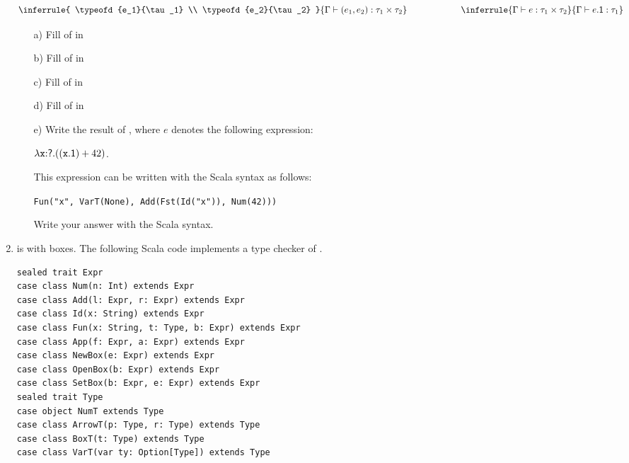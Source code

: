 \begin{enumerate}
\[
\inferrule
{ \typeofd{e_1}{\tau_1} \\ \typeofd{e_2}{\tau_2} }
{ \typeofd{(e_1,e_2)}{\tau_1\times\tau_2} }
\qquad\qquad\qquad
\inferrule
{ \typeofd{e}{\tau_1\times\tau_2} }
{ \typeofd{e\textsf{.1}}{\tau_1} }
\]

\begin{enumerate}
  \item[a)]
    Fill  of  in 
  \item[b)]
    Fill  of  in 
  \item[c)]
    Fill  of  in 
  \item[d)]
    Fill  of  in 
  \item[e)]
    Write the result of , where $e$ denotes
    the following expression:

\smallskip
    $\lambda\texttt{x}{:}\textsf{?}.((\texttt{x}\textsf{.1})+42)$.
\smallskip

    This expression can be written with the Scala syntax as follows:

\smallskip
    \verb+Fun("x", VarT(None), Add(Fst(Id("x")), Num(42)))+
\smallskip

    Write your answer with the Scala syntax.
\end{enumerate}

\item
{} is  with boxes. The following Scala
code implements a type checker of .
\begin{verbatim}
sealed trait Expr
case class Num(n: Int) extends Expr
case class Add(l: Expr, r: Expr) extends Expr
case class Id(x: String) extends Expr
case class Fun(x: String, t: Type, b: Expr) extends Expr
case class App(f: Expr, a: Expr) extends Expr
case class NewBox(e: Expr) extends Expr
case class OpenBox(b: Expr) extends Expr
case class SetBox(b: Expr, e: Expr) extends Expr
sealed trait Type
case object NumT extends Type
case class ArrowT(p: Type, r: Type) extends Type
case class BoxT(t: Type) extends Type
case class VarT(var ty: Option[Type]) extends Type


\end{verbatim}
\end{enumerate}
